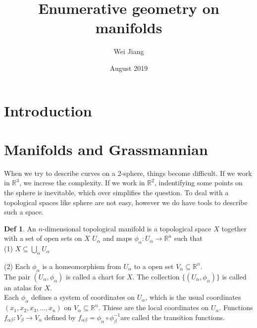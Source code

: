 \documentclass{article}
\title{Enumerative geometry on manifolds}
\author{Wei Jiang}
\date{August 2019}
\begin{document}
\theoremstyle{definition}
\newtheorem{df}{Def}[section]
\newtheorem{eg}[df]{Eg}

\theoremstyle{plain}
\newtheorem{thm}[df]{Thm}


\tableofcontents
\newpage

\section{Introduction}

\newpage
\section{Manifolds and Grassmannian}
 

When we try to describe curves on a 2-sphere, things become difficult. If we 
work in $\mathbb{R}^{3}$, we increse the complexity. If we work in $\mathbb{R}^{2}$,
indentifying some points on the sphere is inevitable, which over simplifies 
the question. To deal with a topological spaces like sphere are not easy, however 
we do have tools to describe such a space.

\begin{df}
An $n$-dimensional topological manifold is a topological space $X$
together with a set of open sets on $X$ ${U_{\alpha}}$ 
and maps $\phi_{\alpha} : U_{\alpha} \longrightarrow \mathbb{R}^{n} $
such that \\

(1) $X \subseteq \bigcup_{\alpha} U_{\alpha} $

(2) Each $\phi_{\alpha}$ is a homeomorphism from $U_{\alpha}$ to a open set 
$V_{\alpha} \subseteq \mathbb{R}^{n} $. \\

The pair $(U_{\alpha},\phi_{\alpha})$ is called a chart for $X$. The collection 
$\{(U_{\alpha},\phi_{\alpha})\}$ is called an atalas for $X$. \\

Each $\phi_{\alpha}$ defines a system of coordinates on $U_{\alpha}$, which is
the usual coordinates $(x_{1},x_{2},x_{3},...,x_{n})$ on 
$V_{\alpha} \subseteq \mathbb{R}^{n}$. Thiese are the local coordinates on $U_{\alpha}$.
Functions $f_{\alpha\beta} : V_{\beta}\longrightarrow V_{\alpha}$ defined by 
$f_{\alpha\beta} = \phi_{\alpha} \circ \phi_{\beta}^{-1}$are called the transition
 functions.

\end{df}
\end{document}
